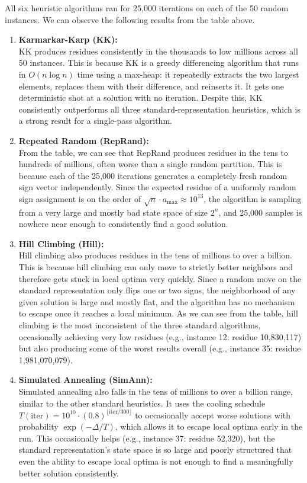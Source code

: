 \documentclass[11pt]{article}
\begin{document}
All six heuristic algorithms ran for 25{,}000 iterations on each of the 50 random instances. We can observe the following results from the table above.

\begin{enumerate}
    \item \textbf{Karmarkar-Karp (KK):} \\
    KK produces residues consistently in the thousands to low millions across all 50 instances. This is because KK is a greedy differencing algorithm that runs in $O(n \log n)$ time using a max-heap: it repeatedly extracts the two largest elements, replaces them with their difference, and reinserts it. It gets one deterministic shot at a solution with no iteration. Despite this, KK consistently outperforms all three standard-representation heuristics, which is a strong result for a single-pass algorithm.

    \item \textbf{Repeated Random (RepRand):} \\
    From the table, we can see that RepRand produces residues in the tens to hundreds of millions, often worse than a single random partition. This is because each of the 25{,}000 iterations generates a completely fresh random sign vector independently. Since the expected residue of a uniformly random sign assignment is on the order of $\sqrt{n} \cdot a_{\max} \approx 10^{13}$, the algorithm is sampling from a very large and mostly bad state space of size $2^n$, and 25{,}000 samples is nowhere near enough to consistently find a good solution.

    \item \textbf{Hill Climbing (Hill):} \\
    Hill climbing also produces residues in the tens of millions to over a billion. This is because hill climbing can only move to strictly better neighbors and therefore gets stuck in local optima very quickly. Since a random move on the standard representation only flips one or two signs, the neighborhood of any given solution is large and mostly flat, and the algorithm has no mechanism to escape once it reaches a local minimum. As we can see from the table, hill climbing is the most inconsistent of the three standard algorithms, occasionally achieving very low residues (e.g., instance 12: residue 10{,}830{,}117) but also producing some of the worst results overall (e.g., instance 35: residue 1{,}981{,}070{,}079).

    \item \textbf{Simulated Annealing (SimAnn):} \\
    Simulated annealing also falls in the tens of millions to over a billion range, similar to the other standard heuristics. It uses the cooling schedule $T(\text{iter}) = 10^{10} \cdot (0.8)^{\lfloor \text{iter}/300 \rfloor}$ to occasionally accept worse solutions with probability $\exp(-\Delta/T)$, which allows it to escape local optima early in the run. This occasionally helps (e.g., instance 37: residue 52{,}320), but the standard representation's state space is so large and poorly structured that even the ability to escape local optima is not enough to find a meaningfully better solution consistently.


\end{enumerate}
\end{document}
